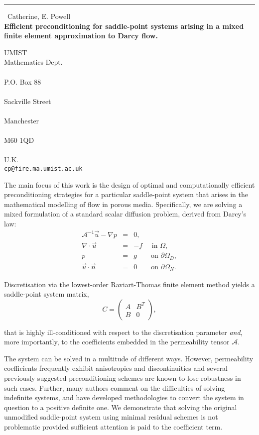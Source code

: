 \documentclass{report}
\begin{document}
\begin{center}
\rule{6in}{1pt} \
{\large Catherine, E. Powell \\
{\bf Efficient preconditioning for saddle-point systems arising in a mixed finite element approximation to Darcy flow.}}

UMIST \\ Mathematics Dept. \\ \\ P.O. Box 88 \\ \\ Sackville Street \\ \\ Manchester \\ \\ M60 1QD \\ \\ U.K.
\\
{\tt cp@fire.ma.umist.ac.uk}\end{center}

The main focus of this work is the design of optimal and
computationally efficient preconditioning strategies for a particular
saddle-point system that arises in the mathematical modelling of flow in
porous media. Specifically, we are solving a mixed formulation of a
standard scalar diffusion problem, derived from Darcy's law:
\begin{equation}
\nonumber
\begin{array}{rcl}
\mathcal{A}^{-1}\vec {u}-\nabla p &= & 0,\\
\nabla \cdot \vec {u} &=& -f \quad \, \, \mbox{in } \Omega,\\
p &=& g
\quad\quad \mbox{on } \partial\Omega_{D},\\
\vec {u}\cdot\vec {n} &=& 0
\quad\quad \mbox{on } \partial\Omega_{N}.
\end{array}
\end{equation}

\noindent
Discretisation via the lowest-order Raviart-Thomas finite
element method yields a saddle-point system matrix,
$$ C = \left(\begin{array}{cc} A & B^{T} \\ B & 0
\end{array}\right),$$

\noindent that is highly ill-conditioned with respect to the
discretisation parameter \textit{and}, more importantly, to the
coefficients embedded in the permeability tensor $\mathcal{A}.$

The system can be solved in a multitude of different ways. However,
permeability coefficients frequently exhibit anisotropies and
discontinuities and several previously suggested preconditioning schemes
are known to lose robustness in such cases. Further, many authors comment
on the difficulties of solving indefinite systems, and have developed
methodologies to convert the system in question to a positive definite
one. We demonstrate that solving the original unmodified saddle-point
system using minimal residual schemes is not problematic provided
sufficient attention is paid to the coefficient term.
\end{document}

